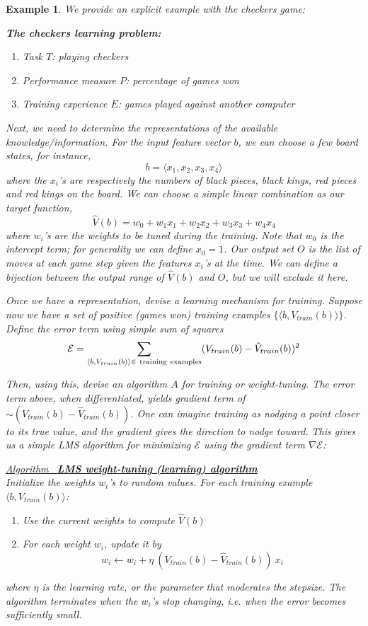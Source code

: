 \documentclass[12pt]{article}  %
\newtheorem{example}{Example}
\newcommand{\algtitle}[1]{\underline{Algorithm \ {\bf #1}} \vspace*{1mm}\\}
\begin{document}
\begin{example}
We provide an explicit example with the checkers game:

{\bf The checkers learning problem:}
\begin{enumerate}
\item Task $T$: playing checkers
\item Performance measure $P$: percentage of games won
\item Training experience $E$: games played against another computer
\end{enumerate}

Next, we need to determine the representations of the available knowledge/information. For the input feature vector $b$, we can choose a few board states, for instance, 
$$b = \langle x_1, x_2, x_3, x_4 \rangle$$
where the $x_i$'s are respectively the numbers of black pieces, black kings, red pieces and red kings on the board. We can choose a simple linear combination as our target function,
$$\hat{V}(b) = w_0 + w_1 x_1 + w_2 x_2 + w_3 x_3 + w_4 x_4$$
where $w_i$'s are the weights to be tuned during the training. Note that $w_0$ is the intercept term; for generality we can define $x_0 = 1$. Our output set $O$ is the list of moves at each game step given the features $x_i$'s at the time. We can define a bijection between the output range of $\hat{V}(b)$ and $O$, but we will exclude it here.

Once we have a representation, devise a learning mechanism for training. Suppose now we have a set of positive (games won) training examples $\{\langle b, V_{train}(b) \rangle\}$. Define the error term using simple sum of squares $$\mathcal{E} = \sum_{\langle b, V_{train}(b) \rangle \in \ {\rm training\ examples}} (V_{train}(b) - \hat{V}_{train}(b))^2$$

Then, using this, devise an algorithm $A$ for training or weight-tuning. The error term above, when differentiated, yields gradient term of $\sim(V_{train}(b) - \hat{V}_{train}(b))$. One can imagine training as nodging a point closer to its true value, and the gradient gives the direction to nodge toward. This gives us a simple LMS algorithm for minimizing $\mathcal{E}$ using the gradient term $\nabla \mathcal{E}$:


\algtitle{LMS weight-tuning (learning) algorithm}
Initialize the weights $w_i$'s to random values. For each training example $\langle b, V_{train}(b) \rangle$:
\begin{enumerate}
	\item Use the current weights to compute $\hat{V}(b)$
	\item For each weight $w_i$, update it by $$w_i \leftarrow w_i + \eta \ (V_{train}(b) - \hat{V}_{train}(b)) \ x_i$$
\end{enumerate}

where $\eta$ is the learning rate, or the parameter that moderates the stepsize. The algorithm terminates when the $w_i$'s stop changing, i.e. when the error becomes sufficiently small.

\end{example}
\end{document}
